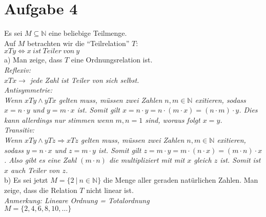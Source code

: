 \section*{Aufgabe 4}

Es sei $M \subseteq \mathbb{N}$ eine beliebige Teilmenge.\\
Auf $M$ betrachten wir die ``Teilrelation'' $T$:\\

$xTy \Leftrightarrow x \ ist \ Teiler \ von \ y$\\

a) Man zeige, dass $T$ eine Ordnungsrelation ist.\\

\textit{Reflexiv:}\\
\textit{$xTx \rightarrow$ jede Zahl ist Teiler von sich selbst.}\\

\textit{Antisymmetrie:}\\
\textit{Wenn $xTy \land yTx$ gelten muss, müssen zwei Zahlen $n,m \in \mathbb{N}$ exitieren, sodass $x = n \cdot y$ und $y = m \cdot x$ ist. Somit gilt $x = n \cdot y = n \cdot (m \cdot x) = (n \cdot m) \cdot y$. Dies kann allerdings nur stimmen wenn $m,n = 1$ sind, woraus folgt $x = y$.}\\

\textit{Transitiv:}\\
\textit{Wenn $xTy \land yTz \Rightarrow xTz$ gelten muss, müssen zwei Zahlen $n,m \in \mathbb{N}$ exitieren, sodass $y = n \cdot x$ und $z = m \cdot y$ ist. Somit gilt $z = m \cdot y = m \cdot (n \cdot x) = (m \cdot n) \cdot x$. Also gibt es eine Zahl $(m \cdot n)$ die multipliziert mit mit $x$ gleich $z$ ist. Somit ist $x$ auch Teiler von $z$.}\\

b) Es sei jetzt $M = \{2 \ | \ n \in \mathbb{N}\}$ die Menge aller geraden natürlichen Zahlen. Man zeige, dass die Relation $T$ nicht linear ist.\\

\textit{Anmerkung: Lineare Ordnung = Totalordnung}\\

$M = \{2, 4, 6, 8, 10, \dots\}$